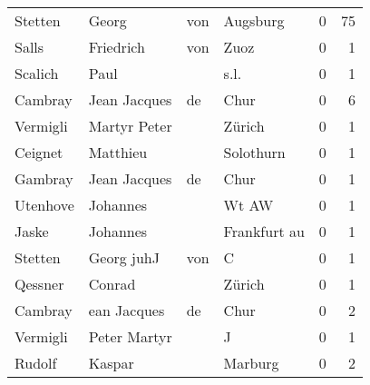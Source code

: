 \begin{center}
\begin{tiny}
\begin{longtabu}{llllrr}
                  Stetten &                              Georg &         von &                                    Augsburg &          0 &        75 \\
                    Salls &                          Friedrich &         von &                                        Zuoz &          0 &         1 \\
                  Scalich &                               Paul &             &                                        s.l. &          0 &         1 \\
                  Cambray &                       Jean Jacques &          de &                                        Chur &          0 &         6 \\
                 Vermigli &                       Martyr Peter &             &                                      Zürich &          0 &         1 \\
                  Ceignet &                           Matthieu &             &                                   Solothurn &          0 &         1 \\
                  Gambray &                       Jean Jacques &          de &                                        Chur &          0 &         1 \\
                 Utenhove &                           Johannes &             &                                       Wt AW &          0 &         1 \\
                    Jaske &                           Johannes &             &                                Frankfurt au &          0 &         1 \\
                  Stetten &                        Georg  juhJ &         von &                                           C &          0 &         1 \\
                  Qessner &                             Conrad &             &                                      Zürich &          0 &         1 \\
                  Cambray &                        ean Jacques &          de &                                        Chur &          0 &         2 \\
                 Vermigli &                       Peter Martyr &             &                                           J &          0 &         1 \\
                   Rudolf &                             Kaspar &             &                                     Marburg &          0 &         2 \\

\end{longtabu}
\end{tiny}
\end{center}
